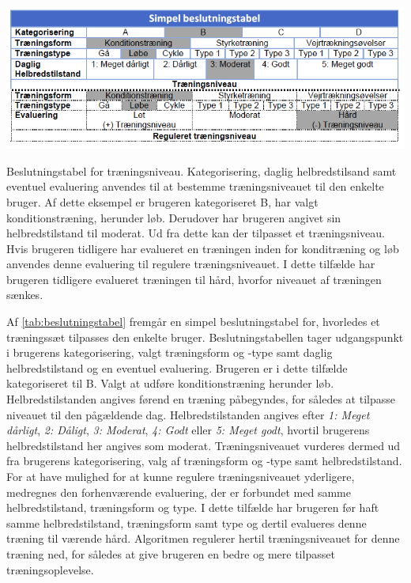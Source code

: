 \begin{table}[H]
\centering
\includegraphics[width=1\textwidth]{figures/aktivitetsdiagram/beslutningstabel}
\caption{Beslutningstabel for træningsniveau. Kategorisering, daglig helbredstilsand samt eventuel evaluering anvendes til at bestemme træningsniveauet til den enkelte bruger. Af dette eksempel er brugeren kategoriseret B, har valgt konditionstræning, herunder løb. Derudover har brugeren angivet sin helbredstilstand til moderat. Ud fra dette kan der tilpasset et træningsniveau. Hvis brugeren tidligere har evalueret en træningen inden for konditræning og løb anvendes denne evaluering til regulere træningsniveauet. I dette tilfælde har brugeren tidligere evalueret træningen til hård, hvorfor niveauet af træningen sænkes.}
\label{tab:beslutningstabel}
\end{table} 

\noindent
Af \autoref{tab:beslutningstabel} fremgår en simpel beslutningstabel for, hvorledes et træningssæt tilpasses den enkelte bruger. Beslutningstabellen tager udgangspunkt i brugerens kategorisering, valgt træningsform og -type samt daglig helbredstilstand og en eventuel evaluering. Brugeren er i dette tilfælde kategoriseret til B. Valgt at udføre konditionstræning herunder løb. Helbredstilstanden angives førend en træning påbegyndes, for således at tilpasse niveauet til den pågældende dag. Helbredstilstanden angives efter \textit{1: Meget dårligt}, \textit{2: Dåligt}, \textit{3: Moderat}, \textit{4: Godt} eller \textit{5: Meget godt}, hvortil brugerens helbredstilstand her angives som moderat.
Træningsniveauet vurderes dermed ud fra brugerens kategorisering, valg af træningsform og -type samt helbredstilstand. 
For at have mulighed for at kunne regulere træningsniveauet yderligere, medregnes den forhenværende evaluering, der er forbundet med samme helbredstilstand, træningsform og type. I dette tilfælde har brugeren før haft samme helbredstilstand, træningsform samt type og dertil evalueres denne træning til værende hård. Algoritmen regulerer hertil træningsniveauet for denne træning ned, for således at give brugeren en bedre og mere tilpasset træningsoplevelse. 
